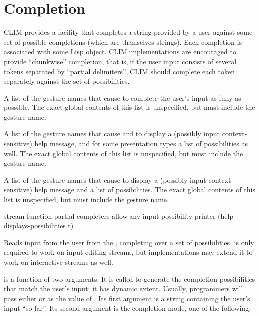 \section {Completion}

CLIM provides a  facility that completes a string provided
by a user against some set of possible completions (which are themselves
strings).  Each completion is associated with some Lisp object.  CLIM
implementations are encouraged to provide ``chunkwise'' completion, that is, if
the user input consists of several tokens separated by ``partial delimiters'',
CLIM should complete each token separately against the set of possibilities.



A list of the gesture names that cause  to complete the
user's input as fully as possible.  The exact global contents of this list is
unspecified, but must include the  gesture name.


A list of the gesture names that cause  and  to
display a (possibly input context-sensitive) help message, and for some
presentation types a list of possibilities as well.  The exact global contents
of this list is unspecified, but must include the  gesture name.


A list of the gesture names that cause  to display a
(possibly input context-sensitive) help message and a list of possibilities.
The exact global contents of this list is unspecified, but must include the
 gesture name.

 {stream function 
                         \key partial-completers allow-any-input
                              possibility-printer (help-displays-possibilities t)}

Reads input from the user from the  ,
completing over a set of possibilities.   is only required to
work on input editing streams, but implementations may extend it to work on
interactive streams as well.

 is a function of two arguments.  It is called to generate the
completion possibilities that match the user's input; it has dynamic extent.
Usually, programmers will pass either  or
 as the value of .  Its first argument
is a string containing the user's input ``so far''.  Its second argument is the
completion mode, one of the following:


